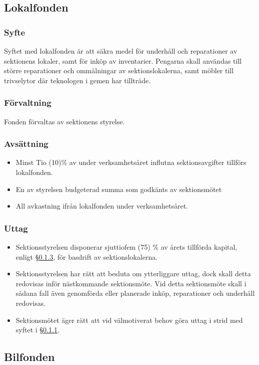 \documentclass[a4paper, 10pt]{article}
\begin{document}
\subsection{Lokalfonden}
\subsubsection{Syfte}
\label{sec:lokalfond_syfte}
Syftet med lokalfonden är att säkra medel för underhåll och reparationer av sektionens lokaler, samt för inköp av inventarier. Pengarna skall användas till större reparationer och ommålningar av sektionslokalerna, samt möbler till trivselytor där teknologen i gemen har tillträde.
\subsubsection{Förvaltning}
Fonden förvaltas av sektionens styrelse.
\subsubsection{Avsättning}
\label{sec:lokalfond_avsattning}
\begin{itemize}
\item Minst Tio (10)\% av under verksamhetsåret influtna sektionsavgifter tillförs lokalfonden.
\item En av styrelsen budgeterad summa som godkänts av sektionsmötet
\item All avkastning ifrån lokalfonden under verksamhetsåret.
\end{itemize}
\subsubsection{Uttag}
\begin{itemize}
\item Sektionsstyrelsen disponerar sjuttiofem (75) \% av årets tillförda kapital,
enligt \S\ref{sec:lokalfond_avsattning}, för basdrift av sektionslokalerna. 
\item Sektionsstyrelsen har rätt att besluta om ytterliggare uttag, dock skall detta redovisas inför nästkommande sektionsmöte. Vid detta sektionsmöte skall i sådana fall även genomförda eller planerade inköp, reparationer och underhåll redovisas.
\item Sektionsmötet äger rätt att vid välmotiverat behov göra uttag i strid med syftet i \S\ref{sec:lokalfond_syfte}.
\end{itemize}

\subsection{Bilfonden}
\end{document}
